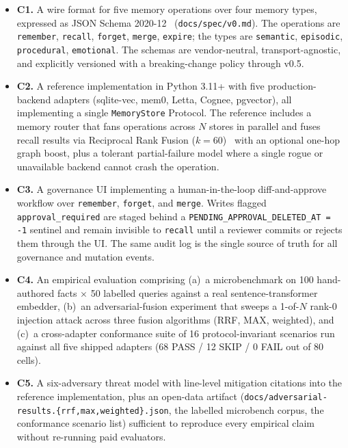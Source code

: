 \documentclass[11pt,letterpaper,twocolumn]{article}
\begin{document}
\begin{itemize}[leftmargin=*]
  \item \textbf{C1.} A wire format for five memory operations over four memory types, expressed as JSON Schema 2020-12~\cite{jsonschema_2020_12} (\texttt{docs/spec/v0.md}). The operations are \texttt{remember}, \texttt{recall}, \texttt{forget}, \texttt{merge}, \texttt{expire}; the types are \texttt{semantic}, \texttt{episodic}, \texttt{procedural}, \texttt{emotional}. The schemas are vendor-neutral, transport-agnostic, and explicitly versioned with a breaking-change policy through v0.5.
  \item \textbf{C2.} A reference implementation in Python 3.11+ with five production-backend adapters (sqlite-vec, mem0, Letta, Cognee, pgvector), all implementing a single \texttt{MemoryStore} Protocol. The reference includes a memory router that fans operations across $N$ stores in parallel and fuses recall results via Reciprocal Rank Fusion ($k=60$)~\cite{cormack2009rrf} with an optional one-hop graph boost, plus a tolerant partial-failure model where a single rogue or unavailable backend cannot crash the operation.
  \item \textbf{C3.} A governance UI implementing a human-in-the-loop diff-and-approve workflow over \texttt{remember}, \texttt{forget}, and \texttt{merge}. Writes flagged \texttt{approval\_required} are staged behind a \texttt{PENDING\_APPROVAL\_DELETED\_AT = -1} sentinel and remain invisible to \texttt{recall} until a reviewer commits or rejects them through the UI. The same audit log is the single source of truth for all governance and mutation events.
  \item \textbf{C4.} An empirical evaluation comprising (a)~a microbenchmark on 100 hand-authored facts $\times$ 50 labelled queries against a real sentence-transformer embedder, (b)~an adversarial-fusion experiment that sweeps a 1-of-$N$ rank-0 injection attack across three fusion algorithms (RRF, MAX, weighted), and (c)~a cross-adapter conformance suite of 16 protocol-invariant scenarios run against all five shipped adapters (68 PASS / 12 SKIP / 0 FAIL out of 80 cells).
  \item \textbf{C5.} A six-adversary threat model with line-level mitigation citations into the reference implementation, plus an open-data artifact (\texttt{docs/adversarial-results.\{rrf,max,weighted\}.json}, the labelled microbench corpus, the conformance scenario list) sufficient to reproduce every empirical claim without re-running paid evaluators.
\end{itemize}
\end{document}
